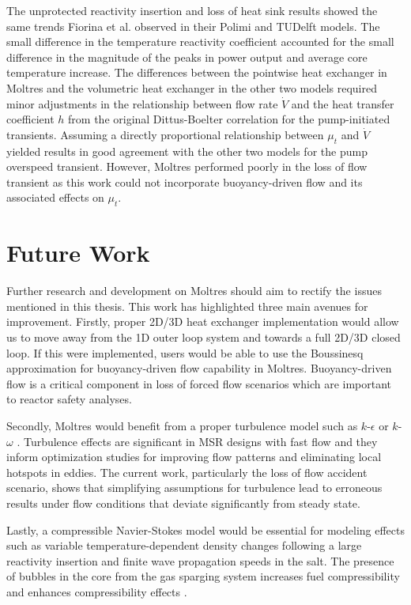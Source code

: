 The unprotected reactivity insertion and loss of heat sink results showed the
same trends Fiorina et al. \cite{fiorina_modelling_2014} observed in their
Polimi and TUDelft models. The
small difference in the temperature reactivity coefficient accounted for the
small difference in the magnitude of the peaks in power output and average
core temperature increase. The differences between the pointwise heat
exchanger in Moltres and the volumetric heat exchanger in the other two
models required minor adjustments in the relationship between flow rate
$\dot{V}$ and the heat transfer coefficient $h$ from the original
Dittus-Boelter correlation for the pump-initiated transients. Assuming a
directly proportional relationship between $\mu_t$ and $\dot{V}$ yielded
results in good agreement with the other two models for the pump overspeed
transient. However, Moltres performed poorly in the loss of flow transient as
this work could not incorporate buoyancy-driven flow and its associated
effects on $\mu_t$.

\section{Future Work}

Further research and development on Moltres should aim to rectify the issues
mentioned in this thesis. This work has highlighted three main avenues for
improvement. Firstly, proper 2D/3D heat exchanger implementation
would allow us to move away from the 1D outer loop system and towards a full
2D/3D closed loop. If this were implemented, users would be able to use
the Boussinesq approximation for buoyancy-driven flow capability in Moltres.
Buoyancy-driven flow is a critical component in loss of forced flow scenarios
which are important to reactor safety analyses.

Secondly, Moltres would benefit from a proper turbulence model such as
$k$-$\epsilon$ \cite{jones_prediction_1972} or $k$-$\omega$
\cite{wilcox_turbulence_2006}. Turbulence effects are
significant in \gls{MSR} designs with fast flow and they inform optimization
studies for improving flow patterns and eliminating local hotspots in eddies.
The current work, particularly the loss of flow accident scenario, shows
that simplifying assumptions for turbulence lead to erroneous results under
flow conditions that deviate significantly from steady state.

Lastly, a compressible Navier-Stokes model would be essential for modeling
effects such as variable temperature-dependent density
changes following a large reactivity insertion and finite wave propagation
speeds in the salt. The presence of bubbles in the core from the gas sparging
system increases fuel compressibility and enhances compressibility effects
\cite{cervi_development_2019}. 
